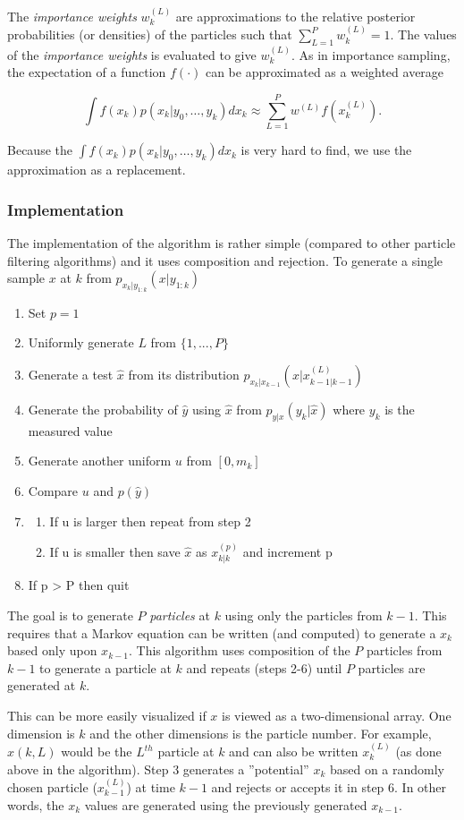 The \emph{importance weights} $w^{(L)}_k$ are approximations to the relative
posterior probabilities (or densities) of the particles such that 
$\sum_{L=1}^P w^{(L)}_k = 1$. The values of the \emph{importance weights} is
evaluated to give $w^{(L)}_k$. As in importance sampling, the expectation of a
function $f(\cdot)$ can be approximated as a weighted average

\begin{equation}
\int f(x_k) p(x_k|y_0,\dots,y_k) dx_k \approx \sum_{L=1}^P w^{(L)} f(x_k^{(L)}).
\end{equation}

Because the $\int f(x_k) p(x_k|y_0,\dots,y_k) dx_k$ is very hard to find, we use
the approximation as a replacement. 

\subsubsection{Implementation}
The implementation of the algorithm is rather simple (compared to other particle
filtering algorithms) and it uses composition and rejection.  To generate a
single sample $x$ at $k$ from $p_{x_k|y_{1:k}}(x|y_{1:k})$

\begin{enumerate}
\item Set $p = 1$
\item Uniformly generate $L$ from $\{1,..., P\}$
\item Generate a test $\hat{x}$ from its distribution
  $p_{x_k|x_{k-1}}(x|x_{k-1|k-1}^{(L)})$
\item Generate the probability of $\hat{y}$ using $\hat{x}$ from
  $p_{y|x}(y_k|\hat{x})$ where $y_k$ is the measured value
\item Generate another uniform $u$ from $[0, m_k]$
\item Compare $u$ and $p\left(\hat{y}\right)$
\item
\begin{enumerate}
\item If u is larger then repeat from step 2
\item If u is smaller then save $\hat{x}$ as $x_{k|k}^{(p)}$ and increment p
\end{enumerate}
\item If p > P then quit
\end{enumerate}

The goal is to generate $P$ \emph{particles} at $k$ using only the particles from
$k-1$. This requires that a Markov equation can be written (and computed) to
generate a $x_k$ based only upon $x_{k-1}$. This algorithm uses composition of
the $P$ particles from $k-1$ to generate a particle at $k$ and repeats (steps 2-6)
until $P$ particles are generated at $k$.

This can be more easily visualized if $x$ is viewed as a two-dimensional array.
One dimension is $k$ and the other dimensions is the particle number.  For
example, $x(k,L)$ would be the $L^{th}$ particle at $k$ and can also be written
$x_k^{(L)}$ (as done above in the algorithm).  Step 3 generates a ''potential''
$x_k$ based on a randomly chosen particle ($x_{k-1}^{(L)}$) at time $k-1$ and
rejects or accepts it in step 6.  In other words, the $x_k$ values are generated
using the previously generated $x_{k-1}$.
